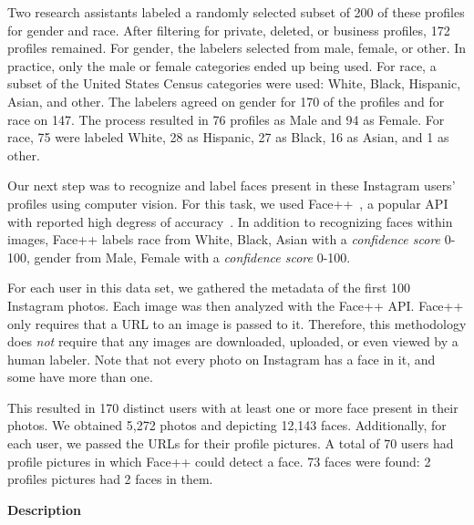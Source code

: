 Two research assistants labeled a randomly selected subset of 200 of these profiles for gender and race.
After filtering for private, deleted, or business profiles, 172 profiles remained.
For gender, the labelers selected from male, female, or other.
In practice, only the male or female categories ended up being used.
For race, a subset of the United States Census categories were used: White, Black, Hispanic, Asian, and other.
The labelers agreed on gender for 170 of the profiles and for race on 147.
The process resulted in 76 profiles as Male and 94 as Female.
For race, 75 were labeled White, 28 as Hispanic, 27 as Black, 16 as Asian, and 1 as other.

Our next step was to recognize and label faces present in these Instagram users' profiles using computer vision.
For this task, we used Face++~\cite{faceplusplus}, a popular API with reported high degress of accuracy~\cite{bakhshi2014faces}.
In addition to recognizing faces within images, Face++ labels race from {White, Black, Asian} with a \emph{confidence score} 0-100, gender from {Male, Female} with a \emph{confidence score} 0-100.

For each user in this data set, we gathered the metadata of the first 100 Instagram photos.
Each image was then analyzed with the Face++ API.
Face++ only requires that a URL to an image is passed to it.
Therefore, this methodology does \emph{not} require that any images are downloaded, uploaded, or even viewed by a human labeler.
Note that not every photo on Instagram has a face in it, and some have more than one.

This resulted in 170 distinct users with at least one or more face present in their photos.
We obtained 5,272 photos and depicting 12,143 faces. 
Additionally, for each user, we passed the URLs for their profile pictures.
A total of 70 users had profile pictures in which Face++ could detect a face.
73 faces were found: 2 profiles pictures had 2 faces in them.

\textbf{Description}


